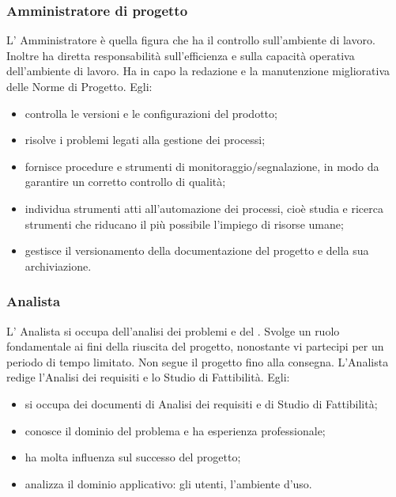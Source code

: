 \subsubsection{Amministratore di progetto}
L’ Amministratore è quella figura che ha il controllo sull'ambiente di lavoro. Inoltre ha diretta responsabilità sull'efficienza e sulla capacità operativa dell'ambiente di lavoro.
Ha in capo la redazione e la manutenzione migliorativa delle Norme di Progetto.
Egli:
\begin{itemize}
\item{controlla le versioni e le configurazioni del prodotto;}
\item{risolve i problemi legati alla gestione dei processi;}
\item{fornisce procedure e strumenti di monitoraggio/segnalazione, in modo da garantire un corretto controllo di qualità;}
\item{individua strumenti atti all’automazione dei processi, cioè studia e ricerca strumenti che riducano il più possibile l'impiego di risorse umane;}
\item{gestisce il versionamento della documentazione del progetto e della sua archiviazione.}
\end{itemize}


\subsubsection{Analista}
L’ Analista si occupa dell’analisi dei problemi e del . Svolge un ruolo fondamentale ai fini della riuscita del progetto, nonostante vi partecipi per un periodo di tempo limitato. Non segue il progetto fino alla consegna.
L'Analista redige l'Analisi dei requisiti e lo Studio di Fattibilità.
Egli:
\begin{itemize}
\item{si occupa dei documenti di Analisi dei requisiti e di Studio di Fattibilità;}
\item{conosce il dominio del problema e ha esperienza professionale;}
\item{ha molta influenza sul successo del progetto;}
\item{analizza il dominio applicativo:  gli utenti, l’ambiente d’uso.}
\end{itemize}


